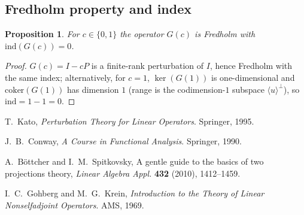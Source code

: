 \documentclass[11pt]{article}
\newtheorem{proposition}[theorem]{Proposition}
\theoremstyle{definition}
\DeclareMathOperator{\kerop}{ker}
\begin{document}
\subsection{Fredholm property and index}

\begin{proposition}\label{prop:fredholm}
For $c\in\{0,1\}$ the operator $G(c)$ is Fredholm with $\mathrm{ind}(G(c))=0$.
\end{proposition}

\begin{proof}
$G(c)=I-cP$ is a finite-rank perturbation of $I$, hence Fredholm with the same index; alternatively, for $c=1$, $\kerop(G(1))$ is one-dimensional and $\mathrm{coker}(G(1))$ has dimension $1$ (range is the codimension-$1$ subspace $\langle u\rangle^\perp$), so $\mathrm{ind}=1-1=0$.
\end{proof}

\begin{thebibliography}{9}

T.~Kato, \emph{Perturbation Theory for Linear Operators}. Springer, 1995.

J.~B.~Conway, \emph{A Course in Functional Analysis}. Springer, 1990.

A.~B\"{o}ttcher and I.~M.~Spitkovsky, A gentle guide to the basics of two projections theory,
\emph{Linear Algebra Appl.} \textbf{432} (2010), 1412--1459.

I.~C.~Gohberg and M.~G.~Krein, \emph{Introduction to the Theory of Linear Nonselfadjoint Operators}. AMS, 1969.

\end{thebibliography}
\end{document}
